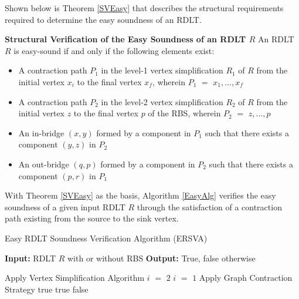 Shown below is Theorem \ref{SVEasy} that describes the structural requirements required to determine the easy soundness of an RDLT.

\begin{thm}\textbf{Structural Verification of the Easy Soundness of an RDLT $ R $}
    \label{SVEasy}
    An RDLT $ R $ is easy-sound if and only if the following elements exist: 
    \begin{itemize}
        \item A contraction path $ P_1 $ in the level-1 vertex simplification $ R_1 $ of $ R $ from the initial vertex $ x_i $ to the final vertex $ x_f $, wherein $ P_1 $ $ = $ $ x_1, \ldots, x_f $
        \item A contraction path $ P_2 $ in the level-2 vertex simplification $ R_2 $ of $ R $ from the initial vertex $ z $ to the final vertex $ p $ of the RBS, wherein $ P_2 $ $ = $ $ z, \ldots, p $
        \item An in-bridge $ (x,y) $ formed by a component in $ P_1 $ such that there exists a component $ (y,z) $ in $ P_2 $
        \item An out-bridge $ (q,p) $ formed by a component in $ P_2 $ such that there exists a component $ (p,r) $ in $ P_1 $
    \end{itemize}
\end{thm}

With Theorem \ref{SVEasy} as the basis, Algorithm \ref{EasyAlg} verifies the easy soundness of a given input RDLT $ R $ through the satisfaction of a contraction path existing from the source to the sink vertex.

\begin{algorithm}[H]
    \caption{Easy RDLT Soundness Verification Algorithm (ERSVA) }
    \label{EasyAlg}
    \begin{algorithmic}
        \State \textbf{Input:} RDLT $ R $ with or without RBS
        \State \textbf{Output:} True, false otherwise
    \end{algorithmic}
    \begin{algorithmic}[1]
        \State Apply Vertex Simplification Algorithm \cite{Malinao2017}
            \State $ i $ $ = $ $ 2 $
        \Else
            \State $ i $ $ = $ $ 1 $
        \EndIf
            \State Apply Graph Contraction Strategy \cite{Malinao2017}
        \EndFor
                    \State \Return true
                \EndIf
            \EndIf
            \State \Return true
        \Else
            \State \Return false
        \EndIf
    \end{algorithmic}
\end{algorithm}

